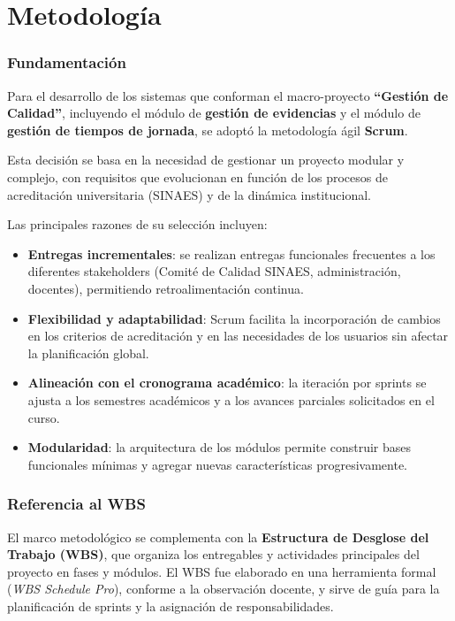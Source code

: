 \chapter{Metodología}

\subsection{Fundamentación}
Para el desarrollo de los sistemas que conforman el macro-proyecto \textbf{“Gestión de Calidad”}, incluyendo el módulo de \textbf{gestión de evidencias} y el módulo de \textbf{gestión de tiempos de jornada}, se adoptó la metodología ágil \textbf{Scrum}.  

Esta decisión se basa en la necesidad de gestionar un proyecto modular y complejo, con requisitos que evolucionan en función de los procesos de acreditación universitaria (SINAES) y de la dinámica institucional.  

Las principales razones de su selección incluyen:
\begin{itemize}
    \item \textbf{Entregas incrementales}: se realizan entregas funcionales frecuentes a los diferentes stakeholders (Comité de Calidad SINAES, administración, docentes), permitiendo retroalimentación continua.
    \item \textbf{Flexibilidad y adaptabilidad}: Scrum facilita la incorporación de cambios en los criterios de acreditación y en las necesidades de los usuarios sin afectar la planificación global.
    \item \textbf{Alineación con el cronograma académico}: la iteración por sprints se ajusta a los semestres académicos y a los avances parciales solicitados en el curso.
    \item \textbf{Modularidad}: la arquitectura de los módulos permite construir bases funcionales mínimas y agregar nuevas características progresivamente.
\end{itemize}

\subsection{Referencia al WBS}
El marco metodológico se complementa con la \textbf{Estructura de Desglose del Trabajo (WBS)}, que organiza los entregables y actividades principales del proyecto en fases y módulos. El WBS fue elaborado en una herramienta formal (\emph{WBS Schedule Pro}), conforme a la observación docente, y sirve de guía para la planificación de sprints y la asignación de responsabilidades.

